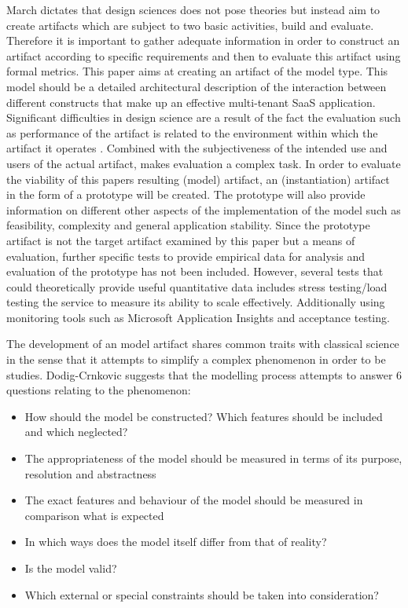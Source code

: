 March \cite{March1995a} dictates that design sciences does not pose theories but instead aim to create artifacts which are subject to two basic activities, build and evaluate. Therefore it is important to gather adequate information in order to construct an artifact according to specific requirements and then to evaluate this artifact using formal metrics. This paper aims at creating an artifact of the model type. This model should be a detailed architectural description of the interaction between different constructs that make up an effective multi-tenant SaaS application. Significant difficulties in design science are a result of the fact the evaluation such as performance of the artifact is related to the environment within which the artifact it operates \cite{March1995a}. Combined with the subjectiveness of the intended use and users of the actual artifact,  makes evaluation a complex task. In order to evaluate the viability of this papers resulting (model) artifact,  an (instantiation) artifact  in the form of a prototype will be created. The prototype will also provide information on different other aspects of the implementation of the model such as feasibility, complexity and general application stability. Since the prototype artifact is not the target artifact examined by this paper but a means of evaluation, further specific tests to provide empirical data for analysis and evaluation of the prototype  has not been included. However, several tests that could theoretically provide useful quantitative data includes stress testing/load testing the service to measure its ability to scale effectively. Additionally using monitoring tools such as Microsoft Application Insights \cite{AppINsight} and acceptance testing.


The development of an model artifact shares common traits with classical science in the sense that it attempts to simplify a complex phenomenon in order to be studies. Dodig-Crnkovic \cite{Dodig-crnkovic} suggests that the modelling process attempts to answer 6 questions relating to the phenomenon:
\begin{itemize}
\item How should the model be constructed? Which features should be included and which neglected?
\item The appropriateness of the model should be measured in terms of its purpose, resolution and abstractness
\item The exact features and behaviour of the model should be measured in comparison what is expected
\item In which ways does the model itself differ from that of reality? 
\item Is the model valid? 
\item Which external or special constraints should be taken into consideration?
\end{itemize}

